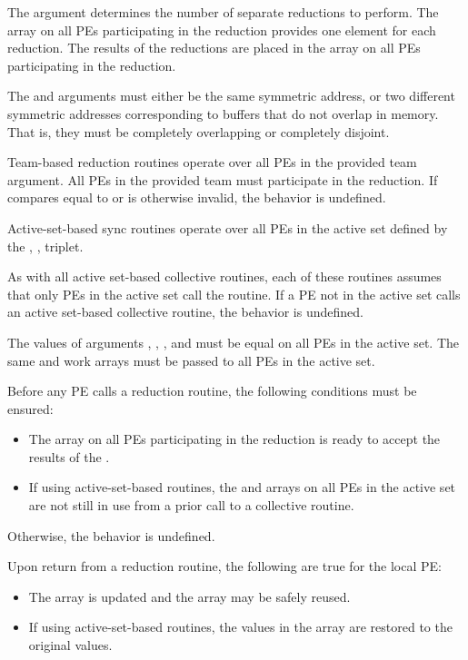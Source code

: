 \begin{apidefinition}
{    The  argument determines the number of separate reductions to
    perform.  The \source{} array on all \acp{PE} participating in the reduction
    provides one element for each reduction.  The results of the reductions are placed in the
    \dest{} array on all \acp{PE} participating in the reduction.

    The \source{} and \dest{} arguments must either be the same symmetric
    address, or two different symmetric addresses corresponding to buffers that
    do not overlap in memory. That is, they must be completely overlapping or
    completely disjoint.

    Team-based reduction routines operate over all \acp{PE} in the provided team argument. All
    \acp{PE} in the provided team must participate in the reduction.
    If  compares equal to  or is
    otherwise invalid, the behavior is undefined.

    Active-set-based sync routines operate over all \acp{PE} in the active set
    defined by the , ,  triplet.

    As with all active set-based collective routines,
    each of these routines assumes
    that only \acp{PE} in the active set call the routine.  If a \ac{PE} not in
    the active set calls an active set-based collective routine,
    the behavior is undefined.

    The values of arguments , , ,
    and  must be equal on all \acp{PE} in the active set.
    The same  and  work arrays must be passed to all
    \acp{PE} in the active set.

    Before any \ac{PE} calls a reduction routine, the following conditions must be ensured:
    \begin{itemize}
    \item The \dest{} array on all \acp{PE} participating in the reduction
      is ready to accept the results of the .
    \item If using active-set-based routines, the
       and  arrays on all \acp{PE} in the
      active set are not still in use from a prior call to a collective
      \openshmem routine.
    \end{itemize}
    Otherwise, the behavior is undefined.
    
    Upon return from a reduction routine, the following are true for the local
    \ac{PE}:
    \begin{itemize}
    \item The \dest{} array is updated and the \source{} array may be safely reused.
    \item If using active-set-based routines,
    the values in the  array are restored to the original values.
    \end{itemize}

}
\end{apidefinition}
